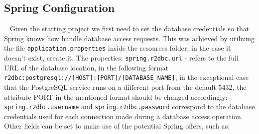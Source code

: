 \subsection{Spring Configuration}~\label{ch:impl:sec:be:subsec:be-spring-config}
Given the starting project we first need to set the database credentials so that Spring knows how handle database access requests. This was achieved by utilizing the file \lstinline{application.properties} inside the resources folder, in the case it doesn't exist, create it. The properties: \lstinline{spring.r2dbc.url} - refers to the full URL of the database location, in the following format \lstinline[keywordstyle=\color{black},commentstyle=\color{black},stringstyle=\color{black}]{r2dbc:postgresql://[HOST]:[PORT]/[DATABASE_NAME]}, in the exceptional case that the PostgreSQL service runs on a different port from the default 5432, the attribute PORT in the mentioned format should be changed accordingly; \lstinline{spring.r2dbc.username} and \lstinline{spring.r2dbc.password} correspond to the database credentials used for each connection made during a database access operation. Other fields can be set to make use of the potential Spring offers, such as:

